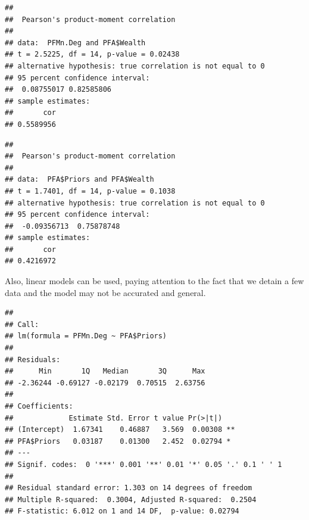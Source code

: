 \documentclass[
  notitlepage,
  onecolumn,
  openany]{book}
\newenvironment{Shaded}{\begin{snugshade}}{\end{snugshade}}
\newcommand{\CommentTok}[1]{\textcolor[rgb]{0.56,0.35,0.01}{\textit{#1}}}
\newcommand{\DocumentationTok}[1]{\textcolor[rgb]{0.56,0.35,0.01}{\textbf{\textit{#1}}}}
\newcommand{\FunctionTok}[1]{\textcolor[rgb]{0.00,0.00,0.00}{#1}}
\newcommand{\NormalTok}[1]{#1}
\newcommand{\OtherTok}[1]{\textcolor[rgb]{0.56,0.35,0.01}{#1}}
\newcommand{\SpecialCharTok}[1]{\textcolor[rgb]{0.00,0.00,0.00}{#1}}
\begin{document}
\begin{verbatim}
## 
##  Pearson's product-moment correlation
## 
## data:  PFMn.Deg and PFA$Wealth
## t = 2.5225, df = 14, p-value = 0.02438
## alternative hypothesis: true correlation is not equal to 0
## 95 percent confidence interval:
##  0.08755017 0.82585806
## sample estimates:
##       cor 
## 0.5589956
\end{verbatim}

\begin{Shaded}
\end{Shaded}

\begin{verbatim}
## 
##  Pearson's product-moment correlation
## 
## data:  PFA$Priors and PFA$Wealth
## t = 1.7401, df = 14, p-value = 0.1038
## alternative hypothesis: true correlation is not equal to 0
## 95 percent confidence interval:
##  -0.09356713  0.75878748
## sample estimates:
##       cor 
## 0.4216972
\end{verbatim}

Also, linear models can be used, paying attention to the fact that we detain a few data and the model may not be accurated and general.

\begin{Shaded}
\end{Shaded}

\begin{verbatim}
## 
## Call:
## lm(formula = PFMn.Deg ~ PFA$Priors)
## 
## Residuals:
##      Min       1Q   Median       3Q      Max 
## -2.36244 -0.69127 -0.02179  0.70515  2.63756 
## 
## Coefficients:
##             Estimate Std. Error t value Pr(>|t|)   
## (Intercept)  1.67341    0.46887   3.569  0.00308 **
## PFA$Priors   0.03187    0.01300   2.452  0.02794 * 
## ---
## Signif. codes:  0 '***' 0.001 '**' 0.01 '*' 0.05 '.' 0.1 ' ' 1
## 
## Residual standard error: 1.303 on 14 degrees of freedom
## Multiple R-squared:  0.3004, Adjusted R-squared:  0.2504 
## F-statistic: 6.012 on 1 and 14 DF,  p-value: 0.02794
\end{verbatim}
\end{document}

